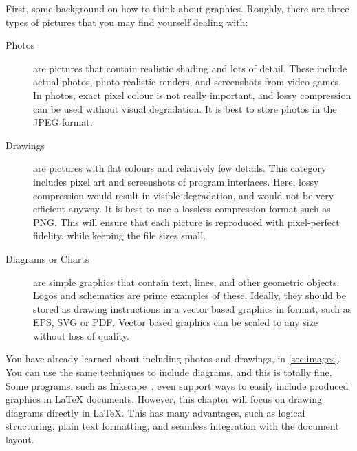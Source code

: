 First, some background on how to think about graphics.
Roughly, there are three types of pictures that you may find yourself
dealing with:
\begin{description}
  \item[Photos] are pictures that contain realistic shading and lots of
    detail. These include actual photos, photo-realistic
    renders, and screenshots from video games. In photos, exact pixel colour is
    not really important, and lossy compression can be used without visual
    degradation. It is best to store photos in the JPEG format.
  \item[Drawings] are pictures with flat colours and relatively few details.
    This category includes pixel art and screenshots of program
    interfaces. Here, lossy compression would result in visible degradation, and
    would not be very efficient anyway. It is best to use a lossless compression
    format such as PNG\@. This will ensure that each picture is reproduced with
    pixel-perfect fidelity, while keeping the file sizes small.
  \item[Diagrams or Charts] are simple graphics that contain text, lines, and
    other geometric objects. Logos and schematics are prime examples of these.
    Ideally, they should be stored as drawing instructions in a vector based
    graphics in format, such as EPS, SVG or PDF\@. Vector based graphics can be
    scaled to any size without loss of quality.
\end{description}

\noindent %
You have already learned about including photos and drawings, in
\autoref{sec:images}. You can use the same techniques to include
diagrams, and this is totally fine. Some programs, such as
Inkscape~\cite{inkscape}, even support ways to easily include produced graphics
in \LaTeX{} documents. However, this chapter will focus on drawing diagrams
directly in \LaTeX{}. This has many advantages, such as logical structuring,
plain text formatting, and seamless integration with the document layout.

